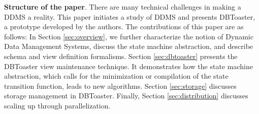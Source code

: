 {\bf Structure of the paper}\/.
There are many technical challenges in making a DDMS a reality. This paper
initiates a study of DDMS and presents DBToaster, a prototype developed by the
authors. The contributions of this paper are as follows: In Section
\ref{sec:overview}, we further characterize the notion of Dynamic Data
Management Systems, discuss the state machine abstraction, and describe schema
and view definition formalisms. Section \ref{sec:dbtoaster} presents the
DBToaster view maintenance technique. It demonstrates how the state machine
abstraction, which calls for the minimization or compilation of the state
transition function, leads to new algorithms. Section \ref{sec:storage}
discusses storage management in DBToaster. Finally, Section
\ref{sec:distribution} discusses scaling up through parallelization.


